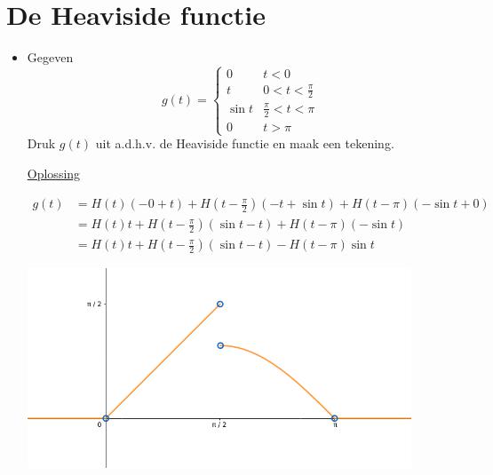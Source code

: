 \documentclass[12pt]{report}
\newcommand{\exercise}[2]{
#1


\underline{Oplossing}

#2

\hrulefill
}
\begin{document}
\section{De Heaviside functie}
\begin{itemize}[label={}]
\item \exercise{Gegeven $$g(t) = \begin{cases}
                            0 & t < 0 \\
                            t &  0 < t < \frac{\pi}{2} \\
                            \sin t & \frac{\pi}{2} < t < \pi \\
                            0 & t > \pi         
                        \end{cases}
$$
Druk $g(t)$ uit a.d.h.v. de Heaviside functie en maak een tekening.}{
\begin{equation*}
\begin{split}
g(t) & = H(t)(-0 + t) + H(t - \frac{\pi}{2})(-t + \sin t) + H(t - \pi)(-\sin t + 0) \\
    & = H(t)t + H(t - \frac{\pi}{2})(\sin t - t) + H(t - \pi)(-\sin t) \\
    & = H(t)t + H(t - \frac{\pi}{2})(\sin t - t) - H(t - \pi)\sin t
\end{split}
\end{equation*}
\begin{center}
\includegraphics[width=0.9\textwidth]{oef2_heaviside}
\end{center}
}


\end{itemize}
\end{document}

